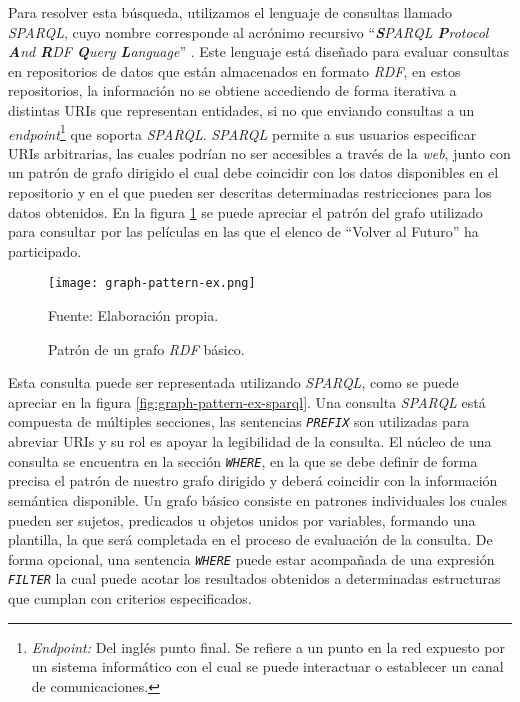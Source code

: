 Para resolver esta búsqueda, utilizamos el lenguaje de consultas llamado \textit{SPARQL}, cuyo nombre corresponde al
acrónimo recursivo ``\textit{\textbf{S}PARQL \textbf{P}rotocol \textbf{A}nd
\textbf{R}DF \textbf{Q}uery \textbf{L}anguage}'' \cite{world2013sparql}. Este
lenguaje está diseñado para evaluar consultas en repositorios de datos que están
almacenados en formato \textit{RDF}, en estos repositorios, la información no se
obtiene accediendo de forma iterativa a distintas URIs que representan
entidades, si no que enviando consultas a un
\textit{endpoint}\footnote{\textit{Endpoint:} Del inglés punto final. Se refiere
a un punto en la red expuesto por un sistema informático con el cual se puede
interactuar o establecer un canal de comunicaciones.} que soporta
\textit{SPARQL}. \textit{SPARQL} permite a sus usuarios especificar URIs
arbitrarias, las cuales podrían no ser accesibles a través de la \textit{web},
junto con un patrón de grafo dirigido el cual debe coincidir con los datos
disponibles en el repositorio y en el que pueden ser descritas determinadas
restricciones para los datos obtenidos. En la figura \ref{fig:graph-pattern-ex}
se puede apreciar el patrón del grafo utilizado para consultar por las películas
en las que el elenco de ``Volver al Futuro'' ha participado.

\begin{figure}
    \centering
    \texttt{[image: graph-pattern-ex.png]}
    \caption{Patrón de un grafo \textit{RDF} básico. } Fuente: Elaboración
    propia.
    \label{fig:graph-pattern-ex}
\end{figure}

Esta consulta puede ser representada utilizando \textit{SPARQL}, como se puede
apreciar en la figura \ref{fig:graph-pattern-ex-sparql}. Una consulta
\textit{SPARQL} está compuesta de múltiples secciones, las sentencias
\textit{\texttt{PREFIX}} son utilizadas para abreviar URIs y su rol es apoyar la
legibilidad de la consulta. El núcleo de una consulta se encuentra en la sección
\textit{\texttt{WHERE}}, en la que se debe definir de forma precisa el patrón
de nuestro grafo dirigido y deberá coincidir con la información semántica
disponible. Un grafo básico consiste en patrones individuales los cuales pueden
ser sujetos, predicados u objetos unidos por variables, formando una plantilla,
la que será completada en el proceso de evaluación de la consulta. De forma
opcional, una sentencia \textit{\texttt{WHERE}} puede estar acompañada de una
expresión \textit{\texttt{FILTER}} la cual puede acotar los resultados obtenidos
a determinadas estructuras que cumplan con criterios especificados.

